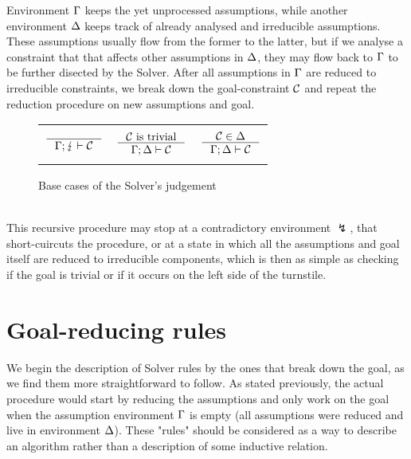 \documentclass[english, mgr]{iithesis}
\newcommand{\solverRule}{\vdash}
\begin{document}
Environment $\Gamma$ keeps the yet unprocessed assumptions,
while another environment $\Delta$ keeps track of already analysed and irreducible assumptions.
These assumptions usually flow from the former to the latter, but if we analyse
a constraint that that affects other assumptions in $\Delta$,
they may flow back to $\Gamma$ to be further disected by the Solver.
After all assumptions in $\Gamma$ are reduced to irreducible constraints,
we break down the goal-constraint $\mathcal{C}$ and repeat the reduction procedure on
new assumptions and goal.
\begin{figure}[htpb]
  \centering
    \begin{tabularx}{\textwidth}{|CCC|}
    \hline & & \\ $
      \inference{
      }{
        \cEnv ; \lightning \solverRule \sconstr
      }
      $ & $
      \inference{
        \sconstr \text{ is trivial}
      }{
        \cEnv ; \icEnv \solverRule \sconstr
      } $ & $
      \inference{
        \sconstr \in \icEnv
      }{
        \cEnv ; \icEnv \solverRule \sconstr
      } $ \\ & & \\ \hline
    \end{tabularx}
  \caption{Base cases of the Solver's judgement}
  \label{fig:solver-base}
\end{figure}
\\
This recursive procedure may stop at a contradictory environment $\lightning$,
that short-cuircuts the procedure, or at
a state in which all the assumptions and goal itself are reduced to irreducible components,
which is then as simple as checking if the goal is trivial or if it
occurs on the left side of the turnstile.

\section{Goal-reducing rules}
We begin the description of Solver rules by the ones that break down the goal,
as we find them more straightforward to follow.
As stated previously, the actual procedure would start by reducing the assumptions
and only work on the goal when the assumption environment $\Gamma$ is empty
(all assumptions were reduced and live in environment $\Delta$).
These "rules" should be considered as a way to describe an algorithm
rather than a description of some inductive relation.
\end{document}

